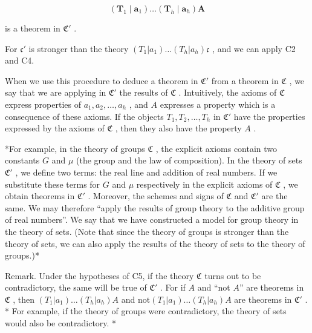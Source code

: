 \[
\left(\boldsymbol {T} _ {1} \mid \boldsymbol {a} _ {1}\right) \dots \left(\boldsymbol {T} _ {h} \mid \boldsymbol {a} _ {h}\right) \boldsymbol {A}
\]

is a theorem in \(\mathfrak{C}'\) .

For \(\mathfrak{c}'\) is stronger than the theory \((T_1|a_1) \ldots (T_h|a_h)\mathfrak{c}\) , and we can apply C2 and C4.

When we use this procedure to deduce a theorem in \(\mathfrak{C}'\) from a theorem in \(\mathfrak{C}\) , we say that we are applying in \(\mathfrak{C}'\) the results of \(\mathfrak{C}\) . Intuitively, the axioms of \(\mathfrak{C}\) express properties of \(a_1, a_2, \ldots, a_h\) , and \(A\) expresses a property which is a consequence of these axioms. If the objects \(T_1, T_2, \ldots, T_h\) in \(\mathfrak{C}'\) have the properties expressed by the axioms of \(\mathfrak{C}\) , then they also have the property \(A\) .

*For example, in the theory of groups \(\mathfrak{C}\) , the explicit axioms contain two constants \(G\) and \(\mu\) (the group and the law of composition). In the theory of sets \(\mathfrak{C}'\) , we define two terms: the real line and addition of real numbers. If we substitute these terms for \(G\) and \(\mu\) respectively in the explicit axioms of \(\mathfrak{C}\) , we obtain theorems in \(\mathfrak{C}'\) . Moreover, the schemes and signs of \(\mathfrak{C}\) and \(\mathfrak{C}'\) are the same. We may therefore ``apply the results of group theory to the additive group of real numbers''. We say that we have constructed a model for group theory in the theory of sets. (Note that since the theory of groups is stronger than the theory of sets, we can also apply the results of the theory of sets to the theory of groups.)*

Remark. Under the hypotheses of C5, if the theory \(\mathfrak{C}\) turns out to be contradictory, the same will be true of \(\mathfrak{C}'\) . For if \(A\) and ``not \(A\)'' are theorems in \(\mathfrak{C}\) , then \((T_1|a_1)\ldots (T_h|a_h)A\) and \(\mathrm{not}(T_1|a_1)\ldots (T_h|a_h)A\) are theorems in \(\mathfrak{C}'\) . * For example, if the theory of groups were contradictory, the theory of sets would also be contradictory. *

